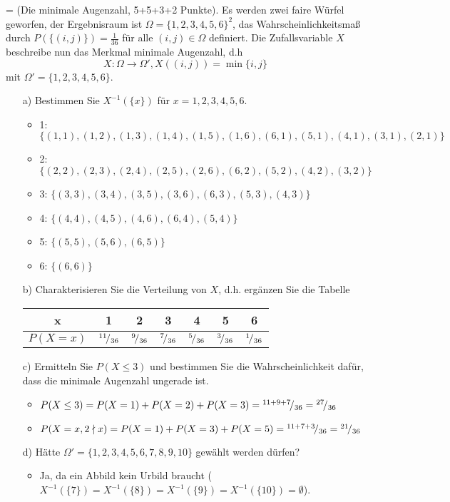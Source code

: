 \documentclass[twoside]{article}
\begin{document}
\ifnum\ZettelDrei=\True
{}
(Die minimale Augenzahl, 5+5+3+2 Punkte).
Es werden zwei faire Würfel geworfen, der Ergebnisraum ist $\Omega = \{1,2,3,4,5,6\}^2$, das Wahrscheinlichkeitsmaß durch $P(\{(i,j)\})=\frac{1}{36}$ für alle $(i,j) \in \Omega$ definiert.
Die Zufallsvariable $X$ beschreibe nun das Merkmal \dq minimale Augenzahl\dq , d.h
\[
	X : \Omega \rightarrow \Omega ', X((i,j)) = \operatorname{min}\{i,j\}
\]
mit $\Omega ' = \{1,2,3,4,5,6\}$.
\begin{enumerate}
	\item[a)] Bestimmen Sie $X^{-1}(\{x\})$ für $x=1,2,3,4,5,6$.
	\begin{itemize}
		\item	1:	$\{(1,1),(1,2),(1,3),(1,4),(1,5),(1,6),(6,1),(5,1),(4,1),(3,1),(2,1)\}$
		\item	2:	$\{(2,2),(2,3),(2,4),(2,5),(2,6),(6,2),(5,2),(4,2),(3,2)\}$
		\item	3:	$\{(3,3),(3,4),(3,5),(3,6),(6,3),(5,3),(4,3)\}$
		\item	4:	$\{(4,4),(4,5),(4,6),(6,4),(5,4)\}$
		\item	5:	$\{(5,5),(5,6),(6,5)\}$
		\item	6:	$\{(6,6)\}$
	\end{itemize}
	\item[b)] Charakterisieren Sie die Verteilung von $X$, d.h. ergänzen Sie die Tabelle
	\begin{center}
		\begin{tabular}{|c|c|c|c|c|c|c|}
		\hline
		x	&	1	&	2	&	3	&	4	&	5	&	6	\\	\hline
		$P(X=x)$	& ${}^{11}\!/_{36}$ & ${}^{9}\!/_{36}$ & ${}^{7}\!/_{36}$ & ${}^{5}\!/_{36}$ & ${}^{3}\!/_{36}$ & ${}^{1}\!/_{36}$	\\	\hline
		\end{tabular}
	\end{center}
	\item[c)] Ermitteln Sie $P(X \leq 3)$ und bestimmen Sie die Wahrscheinlichkeit dafür, dass die minimale Augenzahl ungerade ist.
		\begin{itemize}
			\item $P(X \leq 3) = P(X = 1) + P(X = 2) + P(X = 3) = {}^{11+9+7}\!/_{36} = {}^{27}\!/_{36}$
			\item $P(X = x, 2 \nmid x) = P(X = 1) + P(X = 3) + P(X = 5) = {}^{11+7+3}\!/_{36} = {}^{21}\!/_{36}$
		\end{itemize}
	\item[d)] Hätte $\Omega ' = \{1,2,3,4,5,6,7,8,9,10\}$ gewählt werden dürfen?
	\begin{itemize}
		\item Ja, da ein Abbild kein Urbild braucht ($X^{-1}(\{7\})=X^{-1}(\{8\})=X^{-1}(\{9\})=X^{-1}(\{10\})=\emptyset$).
	\end{itemize}
\end{enumerate}
\end{document}
